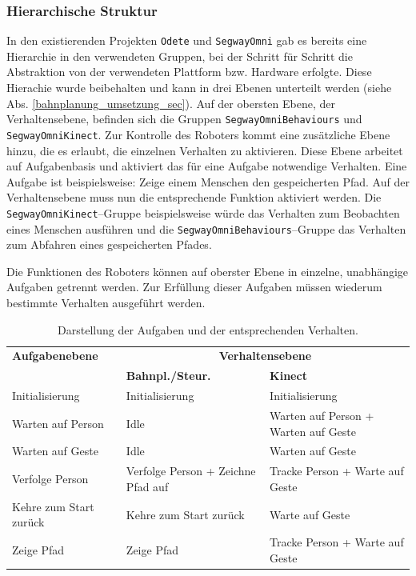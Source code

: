 \subsubsection{Hierarchische Struktur}
\label{integration_umsetzung_hierarchie_sec}

In den existierenden Projekten \lstinline{Odete} und \lstinline{SegwayOmni} gab es bereits eine Hierarchie in den verwendeten Gruppen, bei der Schritt für Schritt die Abstraktion von der verwendeten Plattform bzw. Hardware erfolgte.
Diese Hierachie wurde beibehalten und kann in drei Ebenen unterteilt 
werden (siehe Abs. \ref{bahnplanung_umsetzung_sec}). Auf der obersten Ebene, der Verhaltensebene, befinden sich die 
Gruppen \lstinline{SegwayOmniBehaviours} und \lstinline{SegwayOmniKinect}. Zur Kontrolle des Roboters kommt 
eine zusätzliche Ebene hinzu, die es erlaubt, die einzelnen Verhalten zu aktivieren. Diese Ebene arbeitet auf 
Aufgabenbasis und aktiviert das für eine Aufgabe notwendige Verhalten.
Eine Aufgabe ist beispielsweise: Zeige einem Menschen den gespeicherten Pfad. Auf der Verhaltensebene muss nun die entsprechende 
Funktion aktiviert werden. Die
\lstinline{SegwayOmniKinect}--Gruppe beispielsweise würde das Verhalten zum Beobachten
eines Menschen ausführen und die \lstinline{SegwayOmniBehaviours}--Gruppe das
Verhalten zum Abfahren eines gespeicherten Pfades.

Die Funktionen des Roboters können auf oberster Ebene in einzelne, unabhängige Aufgaben getrennt werden. Zur Erfüllung dieser Aufgaben müssen wiederum bestimmte Verhalten ausgeführt werden.
\begin{table}[h]
	\label{tab:integration_aufgaben}
	\centering
	\begin{tabular}{|p{3.7cm}|p{3cm}|p{3.2cm}|}
	\hline
	\textbf{Aufgabenebene}	&	\multicolumn{2}{c|}{\textbf{Verhaltensebene}}\\
		&	\textbf{Bahnpl./Steur.}	&	\textbf{Kinect}	\\
	\hline
	Initialisierung	&	Initialisierung	&	Initialisierung \\
	\hline
	Warten auf Person	&	Idle	&	Warten auf Person + Warten auf Geste \\
	\hline
	Warten auf Geste	&	Idle	&	Warten auf Geste \\
	\hline
	Verfolge Person	&	Verfolge Person + Zeichne Pfad auf	&	Tracke Person + Warte auf Geste \\
	\hline
	Kehre zum Start zurück	&	Kehre zum Start zurück	&	Warte auf Geste \\
	\hline
	Zeige Pfad	& Zeige Pfad	&	Tracke Person + Warte auf Geste \\
	\hline
	\end{tabular}
	\caption{Darstellung der Aufgaben und der entsprechenden Verhalten.}
\end{table}

